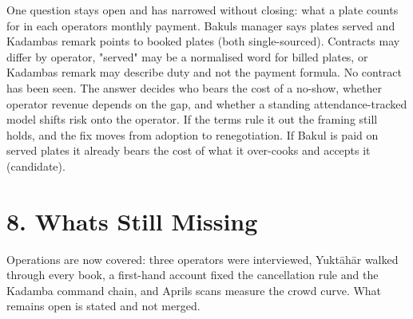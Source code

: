 \documentclass[
  10pt,
  table]{article}
\begin{document}
One question stays open and has narrowed without closing: what a plate counts for in each operator\textquotesingle s monthly payment. Bakul\textquotesingle s manager says plates served and Kadamba\textquotesingle s remark points to booked plates (both single-sourced). Contracts may differ by operator, "served" may be a normalised word for billed plates, or Kadamba\textquotesingle s remark may describe duty and not the payment formula. No contract has been seen. The answer decides who bears the cost of a no-show, whether operator revenue depends on the gap, and whether a standing attendance-tracked model shifts risk onto the operator. If the terms rule it out the framing still holds, and the fix moves from adoption to renegotiation. If Bakul is paid on served plates it already bears the cost of what it over-cooks and accepts it (candidate).

\section{8. What\textquotesingle s Still Missing}\label{whats-still-missing}

Operations are now covered: three operators were interviewed, Yuktāhār walked through every book, a first-hand account fixed the cancellation rule and the Kadamba command chain, and April\textquotesingle s scans measure the crowd curve. What remains open is stated and not merged.
\end{document}
